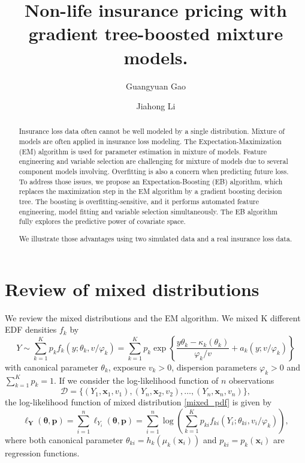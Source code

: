 \documentclass[11pt]{article}
\title{Non-life insurance pricing with gradient tree-boosted mixture models.}
\author{Guangyuan Gao \and Jiahong Li}
\numberwithin{equation}{section}
\def\bx{\boldsymbol{x}}
\begin{document}
\maketitle

\begin{abstract}
Insurance loss data often cannot be well modeled by a single distribution. Mixture of models are often applied in insurance loss modeling. The Expectation-Maximization (EM) algorithm is used for parameter estimation in mixture of models. Feature engineering and variable selection are challenging for mixture of models due to several component models involving. Overfitting is also a concern when predicting future loss. To address those issues, we propose an Expectation-Boosting (EB) algorithm, which replaces the maximization step in the EM algorithm by a gradient boosting decision tree. The boosting is overfitting-sensitive, and it performs automated feature engineering, model fitting and variable selection simultaneously. The EB algorithm fully explores the predictive power of covariate space.

We illustrate those advantages using two simulated data and a real insurance loss data.

\end{abstract}

\section{Review of mixed distributions}
We review the mixed distributions and the EM algorithm.
We mixed K different EDF densities $f_k$ by
\begin{equation}
	Y \sim \sum_{k=1}^{K} p_{k} f_{k}\left(y ; \theta_{k}, v / \varphi_{k}\right)=\sum_{k=1}^{K} p_{k} \exp \left\{\frac{y \theta_{k}-\kappa_{k}\left(\theta_{k}\right)}{\varphi_{k} / v}+a_{k}\left(y ; v / \varphi_{k}\right)\right\}
	\label{mixed_pdf}
\end{equation}
with canonical parameter $\theta_k$, exposure $v_k>0$, dispersion parameters $\varphi_k>0$ and $\sum_{k=1}^K p_k =1$. If we consider the log-likelihood function of $n$ observations 
$$\mathcal{D}=\{(Y_1,\bx_1,v_1),(Y_n,\bx_2,v_2),\ldots,(Y_n,\bx_n,v_n)\},$$ the log-likelihood function of mixed distribution \eqref{mixed_pdf} is given by 
\begin{equation}
	\ell_{\boldsymbol{Y}}(\boldsymbol{\theta}, \boldsymbol{p})=\sum_{i=1}^{n} \ell_{Y_{i}}(\boldsymbol{\theta}, \boldsymbol{p})=\sum_{i=1}^{n} \log \left(\sum_{k=1}^{K} p_{ki} f_{ki}\left(Y_{i} ; \theta_{ki}, v_{i} / \varphi_{k}\right)\right),
	\label{loglike_mixed}
\end{equation}
where both canonical parameter $\theta_{ki}=h_k(\mu_k(\bx_i))$ and $p_{ki}=p_{k}(\bx_i)$ are regression functions.
\end{document}

